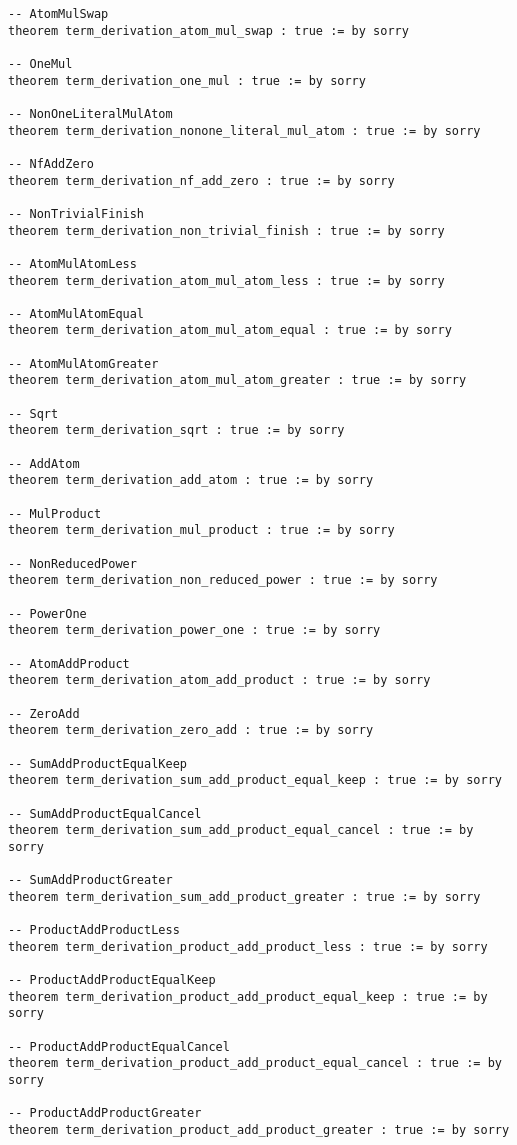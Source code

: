 \documentclass{article}
\begin{document}
\begin{tcolorbox}[colback=white!10, width=\linewidth]
\begin{lstlisting}[language=Lean4]
-- AtomMulSwap
theorem term_derivation_atom_mul_swap : true := by sorry

-- OneMul
theorem term_derivation_one_mul : true := by sorry

-- NonOneLiteralMulAtom
theorem term_derivation_nonone_literal_mul_atom : true := by sorry

-- NfAddZero
theorem term_derivation_nf_add_zero : true := by sorry

-- NonTrivialFinish
theorem term_derivation_non_trivial_finish : true := by sorry

-- AtomMulAtomLess
theorem term_derivation_atom_mul_atom_less : true := by sorry

-- AtomMulAtomEqual
theorem term_derivation_atom_mul_atom_equal : true := by sorry

-- AtomMulAtomGreater
theorem term_derivation_atom_mul_atom_greater : true := by sorry

-- Sqrt
theorem term_derivation_sqrt : true := by sorry

-- AddAtom
theorem term_derivation_add_atom : true := by sorry

-- MulProduct
theorem term_derivation_mul_product : true := by sorry

-- NonReducedPower
theorem term_derivation_non_reduced_power : true := by sorry

-- PowerOne
theorem term_derivation_power_one : true := by sorry

-- AtomAddProduct
theorem term_derivation_atom_add_product : true := by sorry

-- ZeroAdd
theorem term_derivation_zero_add : true := by sorry

-- SumAddProductEqualKeep
theorem term_derivation_sum_add_product_equal_keep : true := by sorry

-- SumAddProductEqualCancel
theorem term_derivation_sum_add_product_equal_cancel : true := by sorry

-- SumAddProductGreater
theorem term_derivation_sum_add_product_greater : true := by sorry

-- ProductAddProductLess
theorem term_derivation_product_add_product_less : true := by sorry

-- ProductAddProductEqualKeep
theorem term_derivation_product_add_product_equal_keep : true := by sorry

-- ProductAddProductEqualCancel
theorem term_derivation_product_add_product_equal_cancel : true := by sorry

-- ProductAddProductGreater
theorem term_derivation_product_add_product_greater : true := by sorry


\end{lstlisting}
\end{tcolorbox}
\end{document}
